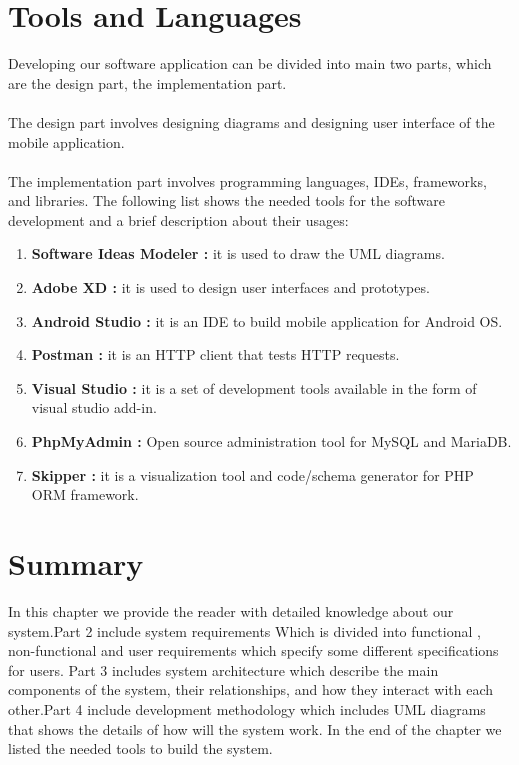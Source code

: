 \section{Tools and Languages}
Developing our software application can be divided into main two parts, which 
are the design part, the implementation part. \\\\
The design part involves designing diagrams and designing user interface of the
mobile application.\\\\
The implementation part involves programming languages, IDEs, frameworks, and 
libraries. The following list shows the needed tools for the software 
development and a brief description about their usages:\\
\begin{enumerate}
  \item \textbf{Software Ideas Modeler : }it is used to draw the UML diagrams.
  \item \textbf{Adobe XD : }it is used to design user interfaces and prototypes.
  \item \textbf{Android Studio : }it is an IDE to build mobile application for Android OS.
  \item \textbf{Postman : }it is an HTTP client that tests HTTP requests.
  \item \textbf{Visual Studio : }it is a set of development tools available in the form of visual studio add-in.
  \item \textbf{PhpMyAdmin : }Open source administration tool for MySQL and MariaDB. 
  \item \textbf{Skipper : }it is a visualization tool and code/schema generator for PHP ORM framework.
\end{enumerate}
\section{Summary}
 In this chapter we provide the reader with detailed knowledge about our system.Part 2 include system requirements Which is divided into functional , non-functional and user requirements which specify some different specifications for users. Part 3 includes system architecture which describe the main components of the system, their relationships, and how they interact with each other.Part 4 include development methodology which includes UML diagrams that shows the details of  how will the system work. In the end of the chapter we listed the needed tools to build the system.